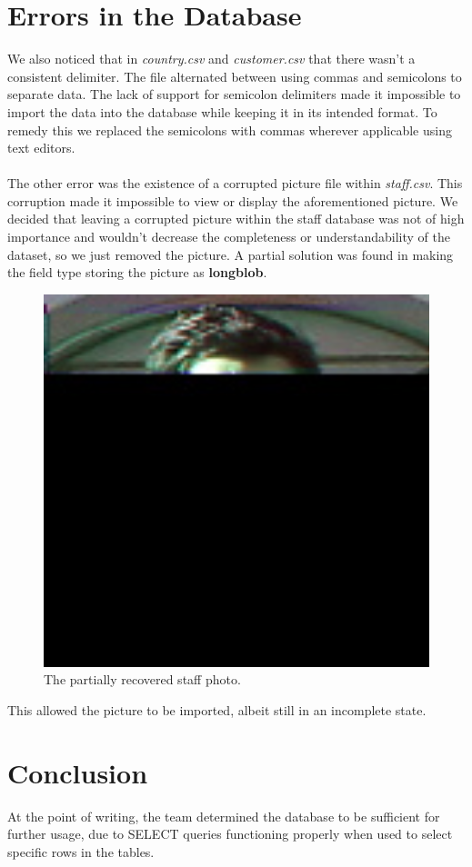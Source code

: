 \documentclass{article}
\begin{document}
\section{Errors in the Database}
	We also noticed that in \emph{country.csv} and \emph{customer.csv} that there wasn’t a consistent delimiter. The file alternated between using commas 
	and semicolons to separate data. The lack of support for semicolon delimiters made it impossible to import the data into the database while keeping it in its intended format. 
	To remedy this we replaced the semicolons with commas wherever applicable using text editors.
	\\\\
	The other error was the existence of a corrupted picture file within \emph{staff.csv}. This corruption made it impossible to view or display the aforementioned picture. 
	We decided that leaving a corrupted picture within the staff database was not of high importance and wouldn’t decrease the completeness or understandability of the dataset,
	so we just removed the picture. A partial solution was found in making the field type storing the picture as \textbf{longblob}. 
	\begin{figure}[H]
		\includegraphics[width=13cm]{staff-picture}
		\caption{The partially recovered staff photo.}
	\end{figure}
	This allowed the picture to be imported, albeit still in an incomplete state. 

\section{Conclusion}
	At the point of writing, the team determined the database to be sufficient for further usage, due to SELECT queries functioning properly when used to select specific rows in the tables.
\end{document}
